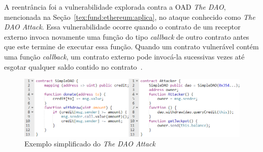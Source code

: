 A reentrância foi a vulnerabilidade explorada contra a OAD \textit{The DAO}, mencionada na Seção~\ref{tex:fund:ethereum:aplica}, no ataque conhecido como \textit{The DAO Attack}. Essa vulnerabilidade ocorre quando o contrato de um receptor externo invoca novamente uma função do tipo \textit{callback} de outro contrato antes que este termine de executar essa função. Quando um contrato vulnerável contém uma função \textit{callback}, um contrato externo pode invocá-la sucessivas vezes até esgotar qualquer saldo contido no contrato~\cite{chen2020survey-ethereum-acm, sayeed2020smart-attacks-ieee}. 

\begin{figure}[!htb]
 \caption{Exemplo simplificado do \textit{The DAO Attack}}
 \label{fig:reentrancia-exemplo}
 \centering
 \includegraphics[scale=0.65]{figuras/reentrancia-exemplo.png}
\end{figure}

